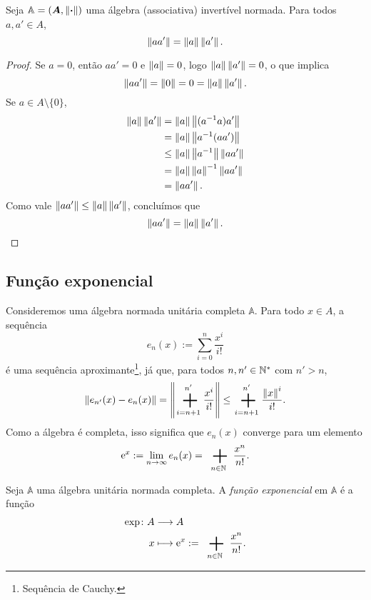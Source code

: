 \begin{exercise}
Seja $\mathbb A = (\bm A,\left\Vert{\bm{\cdot}}\right\Vert)$ uma álgebra (associativa) invertível normada. Para todos $a,a' \in A$,
	\begin{equation*}
	\left\Vert{aa'}\right\Vert = \left\Vert{a}\right\Vert\left\Vert{a'}\right\Vert.
	\end{equation*}
\end{exercise}
\begin{proof}
Se $a=0$, então $aa' = 0$ e $\left\Vert{a}\right\Vert=0$, logo $\left\Vert{a}\right\Vert\left\Vert{a'}\right\Vert=0$, o que implica
	\begin{equation*}
	\left\Vert{aa'}\right\Vert = \left\Vert{0}\right\Vert = 0 = \left\Vert{a}\right\Vert\left\Vert{a'}\right\Vert.
	\end{equation*}
Se $a \in A \setminus \{0\}$,
	\begin{align*}
	\left\Vert{a}\right\Vert\left\Vert{a'}\right\Vert &= \left\Vert{a}\right\Vert\left\Vert{(a^{-1}a)a'}\right\Vert \\
		&= \left\Vert{a}\right\Vert\left\Vert{a^{-1}(aa')}\right\Vert \\
		&\leq \left\Vert{a}\right\Vert\left\Vert{a^{-1}}\right\Vert \left\Vert{aa'}\right\Vert \\
		&= \left\Vert{a}\right\Vert\left\Vert{a}\right\Vert^{-1} \left\Vert{aa'}\right\Vert \\
		&= \left\Vert{aa'}\right\Vert.
	\end{align*}
Como vale $\left\Vert{aa'}\right\Vert \leq \left\Vert{a}\right\Vert\left\Vert{a'}\right\Vert$, concluímos que
	\begin{equation*}
	\left\Vert{aa'}\right\Vert = \left\Vert{a}\right\Vert\left\Vert{a'}\right\Vert.
	\qedhere
	\end{equation*}
\end{proof}


\subsection{Função exponencial}

Consideremos uma álgebra normada unitária completa $\mathbb A$. Para todo $x \in A$, a sequência
	\begin{equation*}
	e_n(x) := \sum_{i=0}^{n} \frac{x^i}{i!}
	\end{equation*}
é uma sequência aproximante\footnote{Sequência de Cauchy.}, já que, para todos $n,n' \in \mathbb{N}^*$ com $n' > n$,
	\begin{equation*}
	\nor{e_{n'}(x)-e_n(x)} = \nor{\sum_{i=n+1}^{n'} \frac{x^i}{i!}} \leq \sum_{i=n+1}^{n'} \frac{\nor{x}^i}{i!}.
	\end{equation*}
Como a álgebra é completa, isso significa que $e_n(x)$ converge para um elemento
	\begin{equation*}
	\e^{x} := \lim_{n \to \infty} e_n(x) = \sum_{n \in \N} \frac{x^n}{n!}.
	\end{equation*}

\begin{definition}
Seja $\mathbb A$ uma álgebra unitária normada completa. A \emph{função exponencial} em $\mathbb A$ é a função
	\begin{align*}
	\func{\exp}{A}{A}{x}{\e^{x} := \sum_{n \in \N} \frac{x^n}{n!}.}
	\end{align*}
\end{definition}

